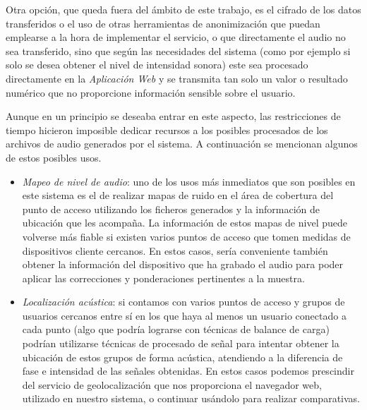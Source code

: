 Otra opción, que queda fuera del ámbito de este trabajo, es el cifrado de los datos transferidos o el uso de otras herramientas de anonimización que puedan emplearse a la hora de implementar el servicio, o que directamente el audio no sea transferido, sino que según las necesidades del sistema (como por ejemplo si solo se desea obtener el nivel de intensidad sonora) este sea procesado directamente en la \emph{Aplicación Web} y se transmita tan solo un valor o resultado numérico que no proporcione información sensible sobre el usuario.


Aunque en un principio se deseaba entrar en este aspecto, las restricciones de tiempo hicieron imposible dedicar recursos a los posibles procesados de los archivos de audio generados por el sistema. A continuación se mencionan algunos de estos posibles usos.

\begin{itemize}
\item \emph{Mapeo de nivel de audio}: uno de los usos más inmediatos que son posibles en este sistema es el de realizar mapas de ruido en el área de cobertura del punto de acceso utilizando los ficheros generados y la información de ubicación que les acompaña. La información de estos mapas de nivel puede volverse más fiable si existen varios puntos de acceso que tomen medidas de dispositivos cliente cercanos. En estos casos, sería conveniente también obtener la información del dispositivo que ha grabado el audio para poder aplicar las correcciones y ponderaciones pertinentes a la muestra.
\item \emph{Localización acústica}: si contamos con varios puntos de acceso y grupos de usuarios cercanos entre sí en los que haya al menos un usuario conectado a cada punto (algo que podría lograrse con técnicas de balance de carga) podrían utilizarse técnicas de procesado de señal para intentar obtener la ubicación de estos grupos de forma acústica, atendiendo a la diferencia de fase e intensidad de las señales obtenidas. En estos casos podemos prescindir del servicio de geolocalización que nos proporciona el navegador web, utilizado en nuestro sistema, o continuar usándolo para realizar comparativas.
\end{itemize}


